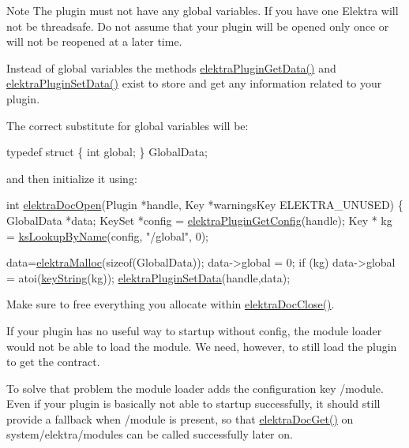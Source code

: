 \begin{DoxyNote}{Note}
The plugin must not have any global variables. If you have one Elektra will not be threadsafe. Do not assume that your plugin will be opened only once or will not be reopened at a later time.
\end{DoxyNote}
Instead of global variables the methods \hyperlink{group__plugin_gaafcf3216b46292f222b8cc7828b4dd20}{elektra\+Plugin\+Get\+Data()} and \hyperlink{group__plugin_gaf4b941a52ff55d0ca2a9158d90208ef2}{elektra\+Plugin\+Set\+Data()} exist to store and get any information related to your plugin.

The correct substitute for global variables will be\+:


\begin{DoxyCodeInclude}
\textcolor{keyword}{typedef} \textcolor{keyword}{struct }\{ \textcolor{keywordtype}{int} global; \} GlobalData;
\end{DoxyCodeInclude}
 and then initialize it using\+:


\begin{DoxyCodeInclude}
\textcolor{keywordtype}{int} \hyperlink{group__plugin_ga23c2eb3584e38a4d494eb8f91e5e3d8d}{elektraDocOpen}(Plugin *handle, Key *warningsKey ELEKTRA\_UNUSED)
\{
        GlobalData *data;
        KeySet *config = \hyperlink{group__plugin_ga644bead796506c172817724051c977c9}{elektraPluginGetConfig}(handle);
        Key * kg = \hyperlink{group__keyset_gad2e30fb6d4739d917c5abb2ac2f9c1a1}{ksLookupByName}(config, \textcolor{stringliteral}{"/global"}, 0);

        data=\hyperlink{internal_8c_a35cdc2e5caed3454cb73b4fc7f37858c}{elektraMalloc}(\textcolor{keyword}{sizeof}(GlobalData));
        data->global = 0;
        \textcolor{keywordflow}{if} (kg) data->global = atoi(\hyperlink{group__keyvalue_ga880936f2481d28e6e2acbe7486a21d05}{keyString}(kg));
        \hyperlink{group__plugin_gaf4b941a52ff55d0ca2a9158d90208ef2}{elektraPluginSetData}(handle,data);
\end{DoxyCodeInclude}
 Make sure to free everything you allocate within \hyperlink{group__plugin_ga1236aefe5b2baf8b7bf636ba5aa9ea29}{elektra\+Doc\+Close()}.

If your plugin has no useful way to startup without config, the module loader would not be able to load the module. We need, however, to still load the plugin to get the contract.

To solve that problem the module loader adds the configuration key /module. Even if your plugin is basically not able to startup successfully, it should still provide a fallback when /module is present, so that \hyperlink{group__plugin_gacb69f3441c6d84241b4362f958fbe313}{elektra\+Doc\+Get()} on system/elektra/modules can be called successfully later on.


